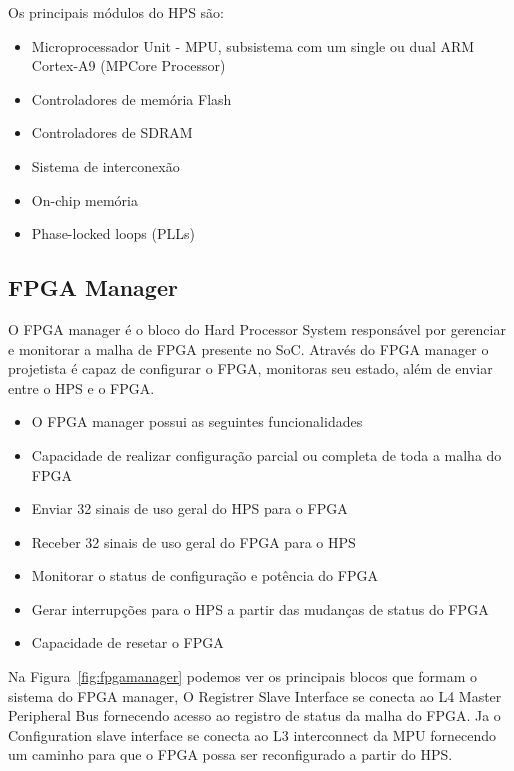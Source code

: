 Os principais módulos do HPS são:

\begin{itemize}
    \item Microprocessador Unit - MPU, subsistema com um single ou dual ARM Cortex-A9 (MPCore Processor)
    \item Controladores de memória Flash
    \item Controladores de SDRAM
    \item Sistema de interconexão
    \item On-chip memória 
    \item Phase-locked loops (PLLs) 
\end{itemize}

\subsection{FPGA Manager}
O FPGA manager é o bloco do Hard Processor System responsável por gerenciar e monitorar a malha de FPGA presente no SoC. Através do FPGA manager o projetista é capaz de configurar o FPGA, monitoras seu estado, além de enviar entre o HPS e o FPGA. 

\begin{itemize}
    \item O FPGA manager possui as seguintes funcionalidades 
    \item Capacidade de realizar configuração parcial ou completa de toda a malha do FPGA
    \item Enviar 32 sinais de uso geral  do HPS para o FPGA
    \item Receber 32 sinais de uso geral do FPGA para o HPS
    \item Monitorar o status de configuração e potência do FPGA
    \item Gerar interrupções para o HPS a partir das mudanças de status do FPGA
    \item Capacidade de resetar o FPGA 
\end{itemize}

Na Figura~\ref{fig:fpgamanager} podemos ver os principais blocos que formam o sistema do FPGA manager, O Registrer Slave Interface se conecta ao L4 Master Peripheral Bus fornecendo acesso ao registro de status da malha do FPGA. Ja o Configuration slave interface se conecta ao L3 interconnect da MPU fornecendo um caminho para que o FPGA possa ser reconfigurado a partir do HPS\@.

